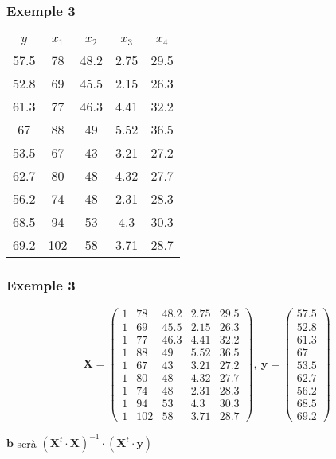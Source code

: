 \documentclass[12pt,t]{beamer}
\theoremstyle{plain}
\theoremstyle{definition}
\begin{document}
\begin{frame}
\frametitle{Exemple 3}

\begin{center}\begin{tabular}{|c|c|c|c|c|}\hline
$y$ & $x_1$ & $x_2$ & $x_3$ & $x_4$\\\hline
57.5&78&48.2&2.75&29.5\\ 52.8&69&45.5&2.15&26.3\\
61.3&77&46.3&4.41&32.2\\ 67&88&49&5.52&36.5\\ 53.5&67&43&3.21&27.2\\
62.7&80&48&4.32&27.7\\ 56.2&74&48&2.31&28.3\\ 68.5&94&53&4.3&30.3\\
69.2&102&58&3.71&28.7\\\hline\end{tabular}\end{center}

\end{frame}
\begin{frame}
\frametitle{Exemple 3}
$$
\mathbf{X}=\left(
\begin{array}{ccccc}
1&78&48.2&2.75&29.5\\
1&69&45.5&2.15&26.3\\
1&77&46.3&4.41&32.2\\
1&88&49&5.52&36.5\\
1&67&43&3.21&27.2\\
1&80&48&4.32&27.7\\
1&74&48&2.31&28.3\\
1&94&53&4.3&30.3\\
1&102&58&3.71&28.7
\end{array}
\right),\
\mathbf{y}=\left(
\begin{array}{c}
57.5\\ 52.8\\ 61.3\\ 67\\ 53.5\\ 62.7\\ 56.2\\ 68.5\\ 69.2
\end{array}
\right)
$$
\medskip
\begin{center}
$\mathbf{b}$ serà $\left(\mathbf{X}^t\cdot \mathbf{X}
\right)^{-1}\cdot \left(\mathbf{X}^t \cdot \mathbf{y}\right)$
\end{center}
\end{frame}
\end{document}

